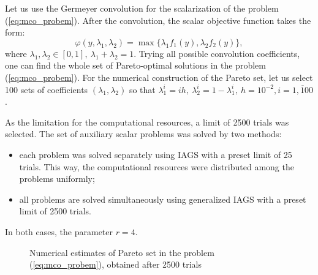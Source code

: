 \documentclass[runningheads]{llncs}
\begin{document}
Let us use the Germeyer convolution for the scalarization of the problem
(\ref{eq:mco_probem}).
After the convolution, the scalar objective function takes the form:
\begin{equation}
  \varphi(y,\lambda_1,\lambda_2)=\max\{\lambda_1 f_1(y), \lambda_2 f_2(y)\},
\end{equation}
where \(\lambda_1,\lambda_2\in[0,1],\: \lambda_1+\lambda_2=1\).
Trying all possible convolution coefficients, one can find the whole set of Pareto-optimal
solutions in the problem (\ref{eq:mco_probem}).
For the numerical construction of the Pareto set, let us select 100 sets of coefficients
\((\lambda_1,\lambda_2)\) so that
\(\lambda_1^i=i h,\: \lambda_2^i=1-\lambda_1^i,\: h=10^{-2},i=\overline{1, 100}\).

As the limitation for the computational resources, a limit of 2500 trials was selected.
The set of auxiliary scalar problems was solved by two methods:
\begin{itemize}
  \item each problem was solved separately using IAGS with a preset limit of 25 trials. This way,
the computational resources were distributed among the problems uniformly;
  \item all problems are solved simultaneously using generalized IAGS with a preset limit of
2500 trials.
\end{itemize}
In both cases, the parameter \(r=4\).

\begin{figure}[ht]
    \centering
    \caption{Numerical estimates of Pareto set in the problem (\ref{eq:mco_probem}), obtained
after 2500 trials}
    \label{fig:mco_pareto}
\end{figure}
\end{document}
